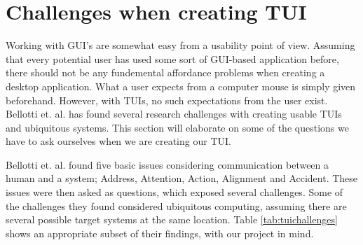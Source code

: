 \section{Challenges when creating TUI}
\label{sec:challenges-with-TUI}

Working with GUI's are somewhat easy from a usability point of view. Assuming that every potential user has used some sort of GUI-based application before, there should not be any fundemental affordance problems when creating a desktop application. What a user expects from a computer mouse is simply given beforehand. However, with TUIs, no such expectations from the user exist. Bellotti et. al. \cite{bellotti2002making} has found several research challenges with creating usable TUIs and ubiquitous systems. This section will elaborate on some of the questions we have to ask ourselves when we are creating our TUI.


Bellotti et. al. found five basic issues considering communication between a human and a system; Address, Attention, Action, Alignment and Accident.  
These issues were then asked as questions, which exposed several challenges. 
Some of the challenges they found considered ubiquitous computing, assuming there are several possible target systems at the same location. Table \ref{tab:tuichallenges} shows an appropriate subset of their findings, with our project in mind.   

